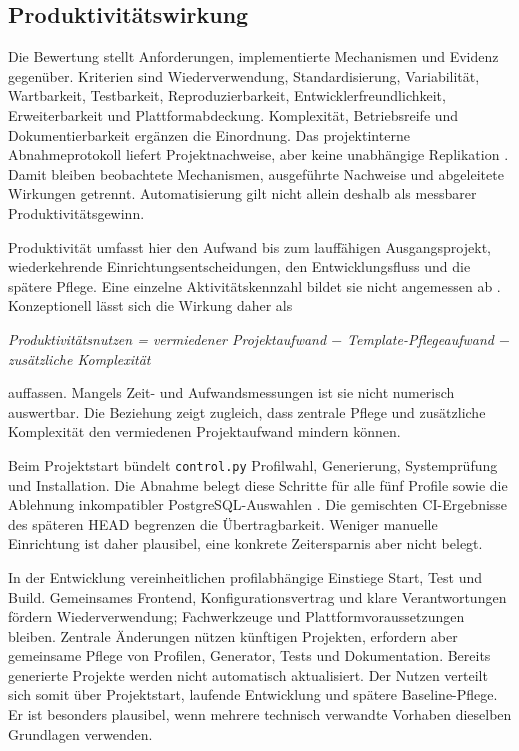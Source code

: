 \subsection{Produktivitätswirkung}
\label{subsec:produktivitaetswirkung}

Die Bewertung stellt Anforderungen, implementierte Mechanismen und Evidenz
gegenüber. Kriterien sind Wiederverwendung, Standardisierung, Variabilität,
Wartbarkeit, Testbarkeit, Reproduzierbarkeit, Entwicklerfreundlichkeit,
Erweiterbarkeit und Plattformabdeckung. Komplexität, Betriebsreife und
Dokumentierbarkeit ergänzen die Einordnung. Das projektinterne
Abnahmeprotokoll liefert Projektnachweise, aber keine unabhängige Replikation
\parencite{kleiveist2026acceptance}.
Damit bleiben beobachtete Mechanismen, ausgeführte Nachweise und abgeleitete
Wirkungen getrennt. Automatisierung gilt nicht allein deshalb als messbarer
Produktivitätsgewinn.

Produktivität umfasst hier den Aufwand bis zum lauffähigen Ausgangsprojekt,
wiederkehrende Einrichtungsentscheidungen, den Entwicklungsfluss und die
spätere Pflege. Eine einzelne Aktivitätskennzahl bildet sie nicht angemessen ab
\parencite{forsgren2021space}. Konzeptionell lässt sich die Wirkung daher als

\begin{center}
  \emph{Produktivitätsnutzen = vermiedener Projektaufwand
  $-$ Template-Pflegeaufwand $-$ zusätzliche Komplexität}
\end{center}

auffassen. Mangels Zeit- und Aufwandsmessungen ist sie nicht numerisch
auswertbar.
Die Beziehung zeigt zugleich, dass zentrale Pflege und zusätzliche Komplexität
den vermiedenen Projektaufwand mindern können.

Beim Projektstart bündelt \texttt{control.py} Profilwahl, Generierung,
Systemprüfung und Installation. Die Abnahme belegt diese Schritte für alle
fünf Profile sowie die Ablehnung inkompatibler PostgreSQL-Auswahlen
\parencite{kleiveist2026acceptance}. Die gemischten CI-Ergebnisse des späteren
HEAD begrenzen die Übertragbarkeit. Weniger manuelle Einrichtung ist daher
plausibel, eine konkrete Zeitersparnis aber nicht belegt.

In der Entwicklung vereinheitlichen profilabhängige Einstiege Start, Test und
Build. Gemeinsames Frontend, Konfigurationsvertrag und klare Verantwortungen
fördern Wiederverwendung; Fachwerkzeuge und Plattformvoraussetzungen bleiben.
Zentrale Änderungen nützen künftigen Projekten, erfordern aber gemeinsame
Pflege von Profilen, Generator, Tests und Dokumentation. Bereits generierte
Projekte werden nicht automatisch aktualisiert.
Der Nutzen verteilt sich somit über Projektstart, laufende Entwicklung und
spätere Baseline-Pflege. Er ist besonders plausibel, wenn mehrere technisch
verwandte Vorhaben dieselben Grundlagen verwenden.

